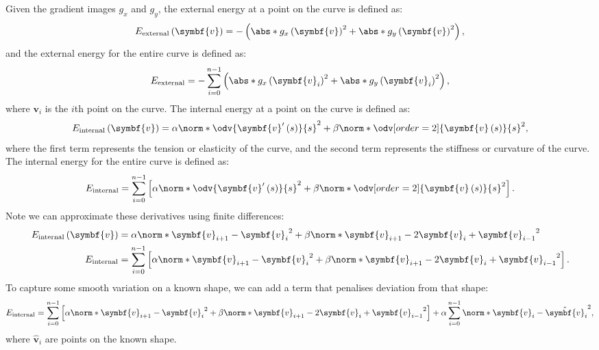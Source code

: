 \documentclass{article}
\begin{document}
Given the gradient images \(g_x\) and \(g_y\), the external energy at a
point on the curve is defined as:
\begin{equation*}
    E_{\text{external}}\left( \symbf{v} \right) = -\left( \abs*{g_x\left( \symbf{v} \right)}^2 + \abs*{g_y\left( \symbf{v} \right)}^2 \right),
\end{equation*}
and the external energy for the entire curve is defined as:
\begin{equation*}
    E_{\text{external}} = - \sum_{i = 0}^{n - 1} \left( \abs*{g_x\left( \symbf{v}_i \right)}^2 + \abs*{g_y\left( \symbf{v}_i \right)}^2 \right),
\end{equation*}
where \(\symbf{v}_i\) is the \(i\)th point on the curve. The internal
energy at a point on the curve is defined as:
\begin{equation*}
    E_{\text{internal}}\left( \symbf{v} \right) = \alpha \norm*{\odv{\symbf{v}'\left( s \right)}{s}}^2 + \beta \norm*{\odv[order=2]{\symbf{v}\left( s \right)}{s}}^2,
\end{equation*}
where the first term represents the tension or elasticity of the curve,
and the second term represents the stiffness or curvature of the curve.
The internal energy for the entire curve is defined as:
\begin{equation*}
    E_{\text{internal}} = \sum_{i = 0}^{n - 1} \left[ \alpha \norm*{\odv{\symbf{v}'\left( s \right)}{s}}^2 + \beta \norm*{\odv[order=2]{\symbf{v}\left( s \right)}{s}}^2 \right].
\end{equation*}
Note we can approximate these derivatives using finite differences:
\begin{align*}
    E_{\text{internal}}\left( \symbf{v} \right) & = \alpha \norm*{\symbf{v}_{i + 1} - \symbf{v}_i}^2 + \beta \norm*{\symbf{v}_{i + 1} - 2 \symbf{v}_i + \symbf{v}_{i - 1}}^2                                      \\
    E_{\text{internal}}                         & = \sum_{i = 0}^{n - 1} \left[ \alpha \norm*{\symbf{v}_{i + 1} - \symbf{v}_i}^2 + \beta \norm*{\symbf{v}_{i + 1} - 2 \symbf{v}_i + \symbf{v}_{i - 1}}^2 \right].
\end{align*}
To capture some smooth variation on a known shape, we can add a term
that penalises deviation from that shape:
\begin{equation*}
    E_{\text{internal}} = \sum_{i = 0}^{n - 1} \left[ \alpha \norm*{\symbf{v}_{i + 1} - \symbf{v}_i}^2 + \beta \norm*{\symbf{v}_{i + 1} - 2 \symbf{v}_i + \symbf{v}_{i - 1}}^2 \right] + \alpha \sum_{i = 0}^{n - 1} \norm*{\symbf{v}_i - \hat{\symbf{v}}_i}^2,
\end{equation*}
where \(\hat{\symbf{v}}_i\) are points on the known shape.
\end{document}
